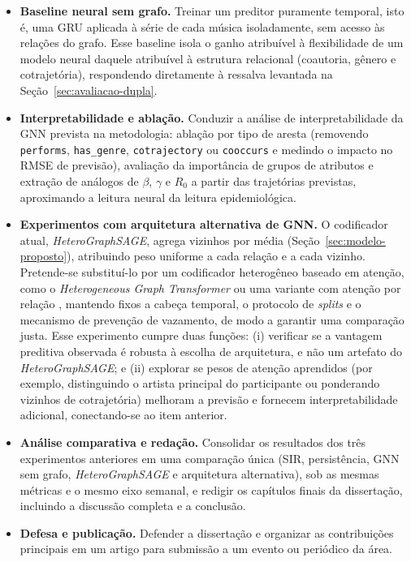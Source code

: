 \begin{itemize}

  \item \textbf{Baseline neural sem grafo.} Treinar um preditor puramente temporal, isto é, uma GRU aplicada à série de cada música isoladamente, sem acesso às relações do grafo. Esse baseline isola o ganho atribuível à flexibilidade de um modelo neural daquele atribuível à estrutura relacional (coautoria, gênero e cotrajetória), respondendo diretamente à ressalva levantada na Seção~\ref{sec:avaliacao-dupla}.

  \item \textbf{Interpretabilidade e ablação.} Conduzir a análise de interpretabilidade da GNN prevista na metodologia: ablação por tipo de aresta (removendo \texttt{performs}, \texttt{has\_genre}, \texttt{cotrajectory} ou \texttt{cooccurs} e medindo o impacto no RMSE de previsão), avaliação da importância de grupos de atributos e extração de análogos de $\beta$, $\gamma$ e $R_0$ a partir das trajetórias previstas, aproximando a leitura neural da leitura epidemiológica.

  \item \textbf{Experimentos com arquitetura alternativa de GNN.} O codificador atual, \emph{HeteroGraphSAGE}, agrega vizinhos por média (Seção~\ref{sec:modelo-proposto}), atribuindo peso uniforme a cada relação e a cada vizinho. Pretende-se substituí-lo por um codificador heterogêneo baseado em atenção, como o \emph{Heterogeneous Graph Transformer} \citep{hu2020hgt} ou uma variante com atenção por relação \citep{velickovic2018gat,wang2019han}, mantendo fixos a cabeça temporal, o protocolo de \emph{splits} e o mecanismo de prevenção de vazamento, de modo a garantir uma comparação justa. Esse experimento cumpre duas funções: (i) verificar se a vantagem preditiva observada é robusta à escolha de arquitetura, e não um artefato do \emph{HeteroGraphSAGE}; e (ii) explorar se pesos de atenção aprendidos (por exemplo, distinguindo o artista principal do participante ou ponderando vizinhos de cotrajetória) melhoram a previsão e fornecem interpretabilidade adicional, conectando-se ao item anterior.

  \item \textbf{Análise comparativa e redação.} Consolidar os resultados dos três experimentos anteriores em uma comparação única (SIR, persistência, GNN sem grafo, \emph{HeteroGraphSAGE} e arquitetura alternativa), sob as mesmas métricas e o mesmo eixo semanal, e redigir os capítulos finais da dissertação, incluindo a discussão completa e a conclusão.

  \item \textbf{Defesa e publicação.} Defender a dissertação e organizar as contribuições principais em um artigo para submissão a um evento ou periódico da área.

\end{itemize}

